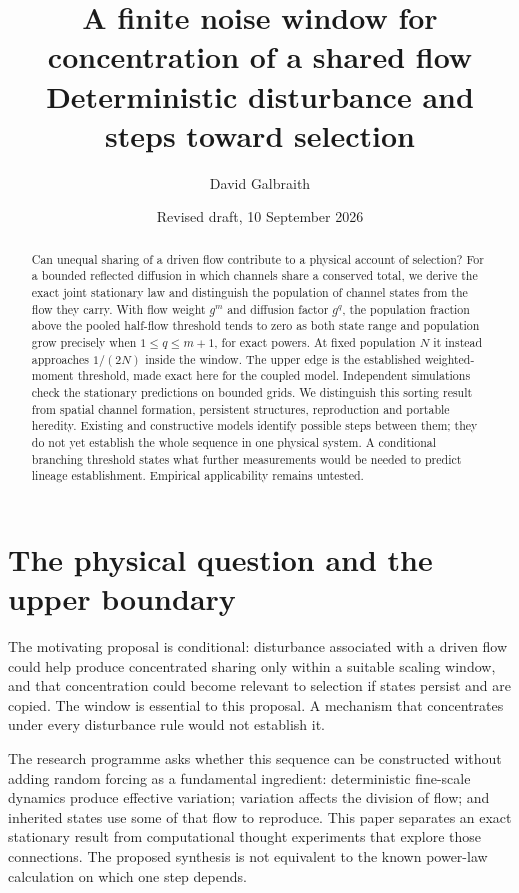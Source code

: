 \documentclass[11pt,a4paper]{article}
\title{A finite noise window for concentration of a shared flow\\[0.4em]
\large Deterministic disturbance and steps toward selection}
\author{David Galbraith}
\date{Revised draft, 10 September 2026}
\begin{document}
\maketitle
\begin{abstract}
Can unequal sharing of a driven flow contribute to a physical account of
selection? For a bounded reflected diffusion in which channels share a conserved
total, we derive the exact joint stationary law and distinguish the population
of channel states from the flow they carry. With flow weight $g^m$ and diffusion
factor $g^q$, the population fraction above the pooled half-flow threshold tends
to zero as both state range and population grow precisely when $1\le q\le m+1$,
for exact powers. At fixed population $N$ it instead approaches $1/(2N)$ inside
the window. The upper edge is the established weighted-moment threshold, made
exact here for the coupled model. Independent simulations check the stationary
predictions on bounded grids. We distinguish this sorting result from spatial
channel formation, persistent structures, reproduction and portable heredity.
Existing and constructive models identify possible steps between them; they do
not yet establish the whole sequence in one physical system. A conditional
branching threshold states what further measurements would be needed to predict
lineage establishment. Empirical applicability remains untested.
\end{abstract}

\section{The physical question and the upper boundary}

The motivating proposal is conditional: disturbance associated with a driven
flow could help produce concentrated sharing only within a suitable scaling
window, and that concentration could become relevant to selection if states
persist and are copied. The window is essential to this proposal. A mechanism
that concentrates under every disturbance rule would not establish it.

The research programme asks whether this sequence can be constructed without
adding random forcing as a fundamental ingredient: deterministic fine-scale
dynamics produce effective variation; variation affects the division of flow;
and inherited states use some of that flow to reproduce. This paper separates
an exact stationary result from computational thought experiments that explore
those connections. The proposed synthesis is not equivalent to the known
power-law calculation on which one step depends.
\end{document}
